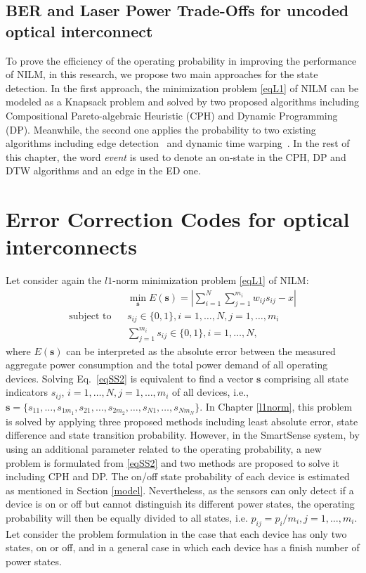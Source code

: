 \subsection{BER and Laser Power Trade-Offs for uncoded optical interconnect}
To prove the efficiency of the operating probability in improving the performance of NILM, in this research, we propose two main approaches for the state detection. In the first approach, the minimization problem \eqref{eqL1} of NILM can be modeled as a Knapsack problem and solved by two proposed algorithms including Compositional Pareto-algebraic Heuristic (CPH) and Dynamic Programming (DP). Meanwhile, the second one applies the probability to two existing algorithms including edge detection~\cite{Hart92} and dynamic time warping~\cite{Liao14}. In the rest of this chapter, the word \textit{event} is used to denote an on-state in the CPH, DP and DTW algorithms and an edge in the ED one.






\section{Error Correction Codes for optical interconnects}\label{knapsack}
Let consider again the $l1$-norm minimization problem \eqref{eqL1} of NILM:
\begin{eqnarray}\label{eqSS2}
& &\min_{\mathbf{s}}{E(\mathbf{s}) = \left|\sum_{i=1}^N{\sum_{j=1}^{m_i}{w_{ij}s_{ij}}}-x\right|} \\
\mbox{subject to}&&s_{ij}\in \{0,1\},  i=1,\ldots,N,j=1,\ldots,m_i \nonumber\\
& & \sum_{j=1}^{m_i}{s_{ij}}\in \{0,1\}, i=1,\ldots,N, \nonumber
\end{eqnarray}
where $E(\mathbf{s})$ can be interpreted as the absolute error between the measured aggregate power consumption and the total power demand of all operating devices. Solving Eq.~\eqref{eqSS2} is equivalent to find a vector $\mathbf{s}$ comprising all state indicators $s_{ij}$, $i=1,\ldots,N, j=1,\ldots,m_i$ of all devices, i.e., $\mathbf{s}=\{s_{11},\ldots,s_{1m_1},s_{21},\ldots,s_{2m_2},\ldots,s_{N1},\ldots,s_{Nm_N}\}$.
In Chapter \ref{l1norm}, this problem is solved by applying three proposed methods including least absolute error, state difference and state transition probability. However, in the SmartSense system, by using an additional parameter related to the operating probability, a new problem is formulated from \eqref{eqSS2} and two methods are proposed to solve it including CPH and DP. The on/off state probability of each device is estimated as mentioned in Section \ref{model}. Nevertheless, as the sensors can only detect if a device is on or off but cannot distinguish its different power states, the operating probability will then be equally divided to all states, i.e. $p_{ij} = p_i/m_i,j=1,\ldots,m_i$. Let consider the problem formulation in the case that each device has only two states, on or off, and in a general case in which each device has a finish number of power states.

